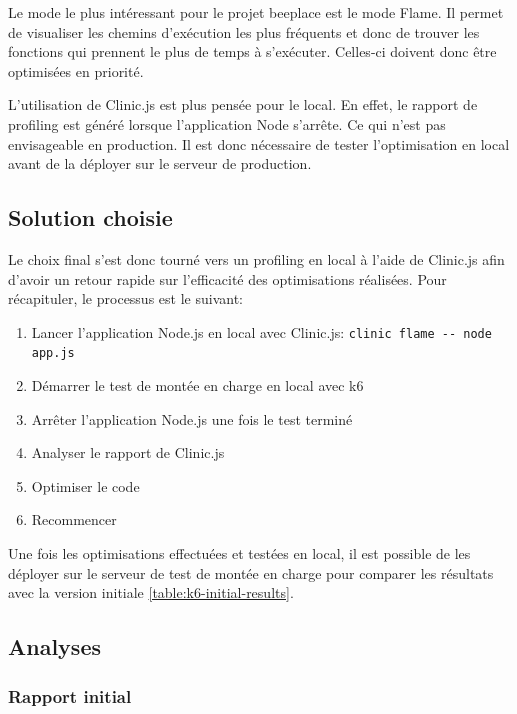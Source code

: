Le mode le plus intéressant pour le projet \gls{beeplace} est le mode Flame. Il permet de visualiser les chemins d'exécution les plus fréquents et donc de trouver les fonctions qui prennent le plus de temps à s'exécuter. Celles-ci doivent donc être optimisées en priorité.

L'utilisation de Clinic.js est plus pensée pour le local. En effet, le rapport de profiling est généré lorsque l'application Node s'arrête. Ce qui n'est pas envisageable en production. Il est donc nécessaire de tester l'optimisation en local avant de la déployer sur le serveur de production.

\subsection{Solution choisie}

Le choix final s'est donc tourné vers un profiling en local à l'aide de Clinic.js afin d'avoir un retour rapide sur l'efficacité des optimisations réalisées. Pour récapituler, le processus est le suivant:

\begin{enumerate}
  \item Lancer l'application Node.js en local avec Clinic.js: \texttt{clinic flame -{}- node app.js}
  \item Démarrer le test de montée en charge en local avec k6
  \item Arrêter l'application Node.js une fois le test terminé
  \item Analyser le rapport de Clinic.js
  \item Optimiser le code
  \item Recommencer
\end{enumerate}

Une fois les optimisations effectuées et testées en local, il est possible de les déployer sur le serveur de test de montée en charge pour comparer les résultats avec la version initiale \ref{table:k6-initial-results}.

\subsection{Analyses}

\subsubsection{Rapport initial}


